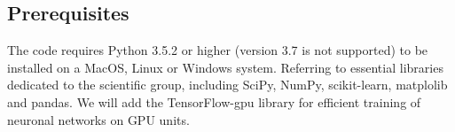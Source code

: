 \subsection{Prerequisites}
\label{subsec:rerequisites}
The code requires Python 3.5.2 or higher (version 3.7 is not supported) to be
installed on a MacOS, Linux or Windows system.
Referring to essential libraries dedicated to the scientific group, including
SciPy, NumPy, scikit-learn, matplolib and pandas.
We will add the TensorFlow-gpu library for efficient training of neuronal
networks on GPU units.
